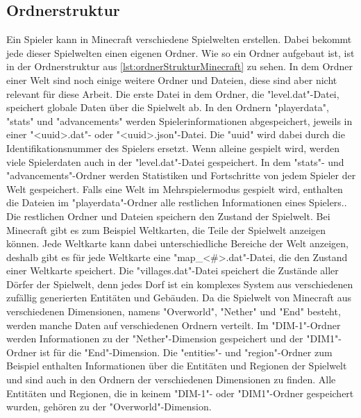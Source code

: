 \subsection{Ordnerstruktur} \label{ssec:ordnerstruktur}
Ein Spieler kann in Minecraft verschiedene Spielwelten erstellen. Dabei bekommt jede dieser Spielwelten einen eigenen Ordner. Wie so ein Ordner aufgebaut ist, ist in der Ordnerstruktur aus \ref{lst:ordnerStrukturMinecraft} zu sehen. In dem Ordner einer Welt sind noch einige weitere Ordner und Dateien, diese sind aber nicht relevant für diese Arbeit. Die erste Datei in dem Ordner, die "level.dat"-Datei, speichert globale Daten über die Spielwelt ab. In den Ordnern "playerdata", "stats" und "advancements" werden Spielerinformationen abgespeichert, jeweils in einer "<uuid>.dat"- oder "<uuid>.json"-Datei. Die "uuid" wird dabei durch die Identifikationsnummer des Spielers ersetzt. Wenn alleine gespielt wird, werden viele Spielerdaten auch in der "level.dat"-Datei gespeichert. In dem "stats"- und "advancements"-Ordner werden Statistiken und Fortschritte von jedem Spieler der Welt gespeichert. Falls eine Welt im Mehrspielermodus gespielt wird, enthalten die Dateien im "playerdata"-Ordner alle restlichen Informationen eines Spielers.\cite{minecraftPlayerdatFormat}. Die restlichen Ordner und Dateien speichern den Zustand der Spielwelt. Bei Minecraft gibt es zum Beispiel Weltkarten, die Teile der Spielwelt anzeigen können. Jede Weltkarte kann dabei unterschiedliche Bereiche der Welt anzeigen, deshalb gibt es für jede Weltkarte eine "map\_<\#>.dat"-Datei, die den Zustand einer Weltkarte speichert. Die "villages.dat"-Datei speichert die Zustände aller Dörfer der Spielwelt, denn jedes Dorf ist ein komplexes System aus verschiedenen zufällig generierten Entitäten und Gebäuden. Da die Spielwelt von Minecraft aus verschiedenen Dimensionen, namens "Overworld", "Nether" und "End" besteht, werden manche Daten auf verschiedenen Ordnern verteilt. Im "DIM-1"-Ordner werden Informationen zu der "Nether"-Dimension gespeichert und der "DIM1"-Ordner ist für die "End"-Dimension. Die "entities"- und "region"-Ordner zum Beispiel enthalten Informationen über die Entitäten und Regionen der Spielwelt und sind auch in den Ordnern der verschiedenen Dimensionen zu finden. Alle Entitäten und Regionen, die in keinem "DIM-1"- oder "DIM1"-Ordner gespeichert wurden, gehören zu der "Overworld"-Dimension.\cite{minecraftFolderStruc}

